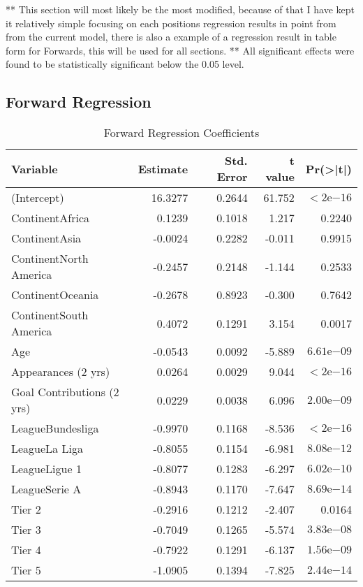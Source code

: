 \documentclass[12pt,a4paper]{article}
\begin{document}
** This section will most likely be the most modified, because of that I have kept it relatively simple focusing on each positions regression results in point from from the current model, there is also a example of a regression result in table form for Forwards, this will be used for all sections.  ** All significant effects were found to be statistically significant below the 0.05 level. 

\subsection{Forward Regression}
\label{subsec:Forward}

\begin{table}[ht]
\centering
\caption{Forward Regression Coefficients}
\begin{tabular}{lrrrr}
\hline
\textbf{Variable} & \textbf{Estimate} & \textbf{Std. Error} & \textbf{t value} & \textbf{Pr(\textgreater{}|t|)} \\
\hline
(Intercept) & 16.3277 & 0.2644 & 61.752 & $< 2\text{e}{-16}$ \\
ContinentAfrica & 0.1239 & 0.1018 & 1.217 & 0.2240 \\
ContinentAsia & -0.0024 & 0.2282 & -0.011 & 0.9915 \\
ContinentNorth America & -0.2457 & 0.2148 & -1.144 & 0.2533 \\
ContinentOceania & -0.2678 & 0.8923 & -0.300 & 0.7642 \\
ContinentSouth America & 0.4072 & 0.1291 & 3.154 & 0.0017 \\
Age & -0.0543 & 0.0092 & -5.889 & $6.61\text{e}{-09}$ \\
Appearances (2 yrs) & 0.0264 & 0.0029 & 9.044 & $< 2\text{e}{-16}$ \\
Goal Contributions (2 yrs) & 0.0229 & 0.0038 & 6.096 & $2.00\text{e}{-09}$ \\
LeagueBundesliga & -0.9970 & 0.1168 & -8.536 & $< 2\text{e}{-16}$ \\
LeagueLa Liga & -0.8055 & 0.1154 & -6.981 & $8.08\text{e}{-12}$ \\
LeagueLigue 1 & -0.8077 & 0.1283 & -6.297 & $6.02\text{e}{-10}$ \\
LeagueSerie A & -0.8943 & 0.1170 & -7.647 & $8.69\text{e}{-14}$ \\
Tier 2 & -0.2916 & 0.1212 & -2.407 & 0.0164 \\
Tier 3 & -0.7049 & 0.1265 & -5.574 & $3.83\text{e}{-08}$ \\
Tier 4 & -0.7922 & 0.1291 & -6.137 & $1.56\text{e}{-09}$ \\
Tier 5 & -1.0905 & 0.1394 & -7.825 & $2.44\text{e}{-14}$ \\
\hline
\end{tabular}
\end{table}
\end{document}
